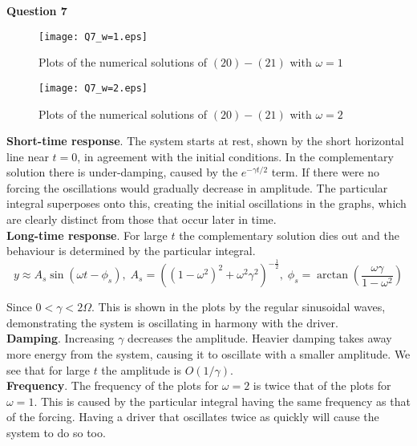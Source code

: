 \documentclass[14pt]{extarticle}
\begin{document}
\pagebreak
\begin{center}
\textbf{Question 7}
\end{center}

\begin{figure}[htp!]
\centering
\texttt{[image: Q7\_w=1.eps]}\\
\caption{Plots of the numerical solutions of $(20)-(21)$ with $\omega = 1$}
\label{figure:6}
\end{figure}


\begin{figure}[htp!]
\centering
\texttt{[image: Q7\_w=2.eps]}\\
\caption{Plots of the numerical solutions of $(20)-(21)$ with $\omega = 2$}
\label{figure:7}
\end{figure}

\noindent \textbf{Short-time response}. The system starts at rest, shown by the short horizontal line near $t=0$, in agreement with the initial conditions. In the complementary solution there is under-damping, caused by the $e^{-\gamma t/2}$ term. If there were no forcing the oscillations would gradually decrease in amplitude. The particular integral superposes onto this, creating the initial oscillations in the graphs, which are clearly distinct from those that occur later in time.\\

\noindent \textbf{Long-time response}. For large $t$ the complementary solution dies out and the behaviour is determined by the particular integral.
\[y \approx A_s\sin(\omega t - \phi_s),\; A_s = \left((1-\omega^2)^2+\omega^2\gamma^2\right)^{-\frac{1}{2}},\; \phi_s =\displaystyle{\arctan\left(\frac{\omega\gamma}{1-\omega^2}\right)} \]

\noindent Since $0<\gamma<2\Omega$. This is shown in the plots by the regular sinusoidal waves, demonstrating the system is oscillating in harmony with the driver. \\

\noindent \textbf{Damping}. Increasing $\gamma$ decreases the amplitude. Heavier damping takes away more energy from the system, causing it to oscillate with a smaller amplitude. We see that for large $t$ the amplitude is $O(1/\gamma)$.\\

\noindent \textbf{Frequency}. The frequency of the plots for $\omega = 2$ is twice that of the plots for $\omega = 1$. This is caused by the particular integral having the same frequency as that of the forcing. Having a driver that oscillates twice as quickly will cause the system to do so too.\\
\end{document}
